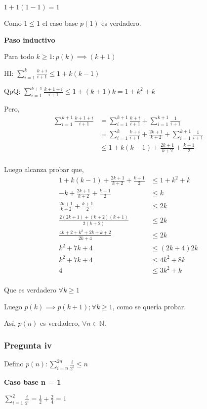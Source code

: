 $ 1+1(1-1) = 1 $

Como $ 1 \leq 1 $ el caso base $p(1)$ es verdadero.

\textbf{Paso inductivo}

Para todo $k \geq 1: p(k) \implies (k+1)$

HI: $\sum_{i=1}^{k}\frac{k+i}{i+1} \leq 1+k(k-1)$

QpQ: $ \sum_{i=1}^{k+1}\frac{k+1+i}{i+1} \leq 1+(k+1)k = 1+k^2 + k$

Pero,
\begin{align*}
    \sum_{i=1}^{k+1}\frac{k+1+i}{i+1} &= \sum_{i=1}^{k+1}\frac{k+i}{i+1} + \sum_{i=1}^{k+1}\frac{1}{i+1} \\
    &= \sum_{i=1}^{k}\frac{k+i}{i+1} + \frac{2k+1}{k+2} + \sum_{i=1}^{k+1}\frac{1}{i+1} \\
    &\leq 1+k(k-1) + \frac{2k+1}{k+2} + \frac{k+1}{2} \\
\end{align*}

Luego alcanza probar que,
\begin{align*}
    1+k(k-1) + \frac{2k+1}{k+2} + \frac{k+1}{2} &\leq 1+k^2 + k \\
    - k + \frac{2k+1}{k+2} + \frac{k+1}{2} &\leq k \\
    \frac{2k+1}{k+2} + \frac{k+1}{2} &\leq 2k \\
    \frac{2(2k+1) + (k+2)(k+1)}{2(k+2)} &\leq 2k \\
    \frac{4k+2 + k^2+2k+k+2}{2k+4} &\leq 2k \\
    k^2 + 7k + 4 &\leq (2k+4)2k \\
    k^2 + 7k + 4 &\leq 4k^2 + 8k \\
    4 &\leq 3k^2 + k\\
\end{align*}

Que es verdadero $\forall k \geq 1$

Luego $p(k) \implies p(k+1); \forall k \geq 1$, como se quería probar.

Así, $p(n)$ es verdadero, $\forall n \in \mathbb{N}$.

\subsubsection{Pregunta iv}

Defino $ p(n): \sum_{i=n}^{2n}\frac{i}{2^i} \leq n$

\textbf{Caso base n = 1}

$ \sum_{i=1}^{2}\frac{i}{2^i} = \frac{1}{2} + \frac{2}{4} = 1 $

